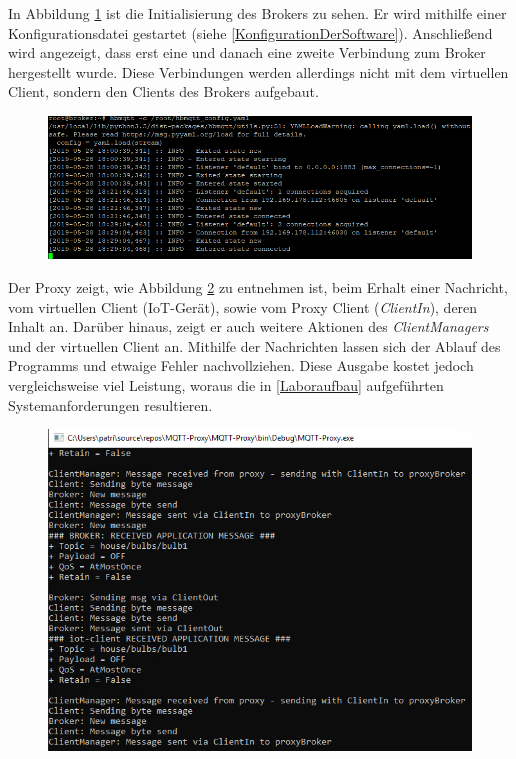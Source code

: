 In Abbildung \ref{fig:broker_connections} ist die Initialisierung des Brokers zu sehen. Er wird mithilfe einer Konfigurationsdatei gestartet (siehe \ref{KonfigurationDerSoftware}). Anschließend wird angezeigt, dass erst eine und danach eine zweite Verbindung zum Broker hergestellt wurde. Diese Verbindungen werden allerdings nicht mit dem virtuellen Client, sondern den Clients des Brokers aufgebaut.
\begin{figure}[!h]%
    \centering
    \includegraphics[width=14cm]{tex/bilder/6_validierung/BrokerConnections.png}
    \label{fig:broker_connections}
\end{figure}

Der Proxy zeigt, wie Abbildung \ref{fig:proxy_messages} zu entnehmen ist, beim Erhalt einer Nachricht, vom virtuellen Client (\ac{IoT}-Gerät), sowie vom Proxy Client (\emph{ClientIn}), deren Inhalt an.
Darüber hinaus, zeigt er auch weitere Aktionen des \emph{ClientManagers} und der virtuellen Client an.
Mithilfe der Nachrichten lassen sich der Ablauf des Programms und etwaige Fehler nachvollziehen. Diese Ausgabe kostet jedoch vergleichsweise viel Leistung, woraus die in \ref{Laboraufbau} aufgeführten Systemanforderungen resultieren. 
\begin{figure}[!h]%
    \centering
    \includegraphics[width=12cm]{tex/bilder/6_validierung/ProxyMessages.png}
    \label{fig:proxy_messages}
\end{figure}

